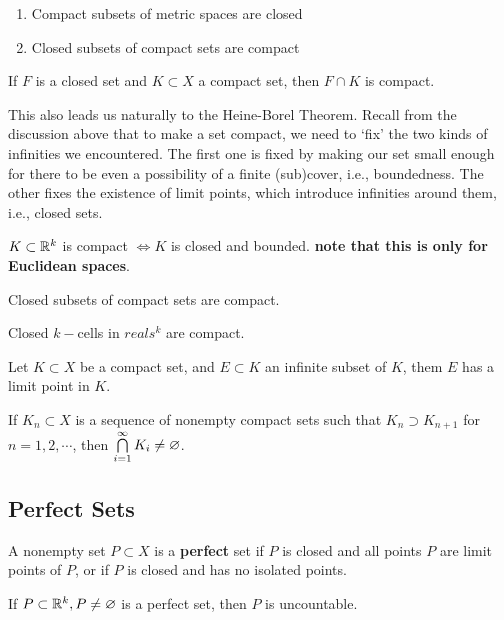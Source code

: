 \begin{lemma}
\begin{enumerate}
\item Compact subsets of metric spaces are closed
\item Closed subsets of compact sets are compact
\end{enumerate}
\end{lemma}
\begin{corollary}
If $F$ is a closed set and $K\subset X$ a compact set, then $F\cap K$ is compact.
\end{corollary}

This also leads us naturally to the Heine-Borel Theorem. Recall from the discussion above that to make a set compact, we need to `fix' the two kinds of infinities we encountered. The first one is fixed by making our set small enough for there to be even a possibility of a finite (sub)cover, i.e., boundedness. The other fixes the existence of limit points, which introduce infinities around them, i.e., closed sets.

\begin{theorem}
$K\subset \mathbb{R}^k$ is compact $\iff K$ is closed and bounded. \textbf{note that this is only for Euclidean spaces}.
\begin{lemma}
Closed subsets of compact sets are compact.
\end{lemma}
\begin{lemma}
Closed $k-$cells in $reals^k$ are compact.
\end{lemma}
\end{theorem}

\begin{theorem}
Let $K\subset X$ be a compact set, and $E\subset K$ an infinite subset of $K$, them $E$ has a limit point in $K$.
\end{theorem}

\begin{theorem}
If $K_n\subset X$ is a sequence of nonempty compact sets such that $K_n\supset K_{n+1}$ for $n=1,2,\cdots$, then $\bigcap\limits_{i=1}^{\infty}K_i \neq \varnothing$.
\end{theorem}

\subsection{Perfect Sets}
\begin{definition}
A nonempty set $P\subset X$ is a \textbf{perfect} set if $P$ is closed and all points $P$ are limit points of $P$, or if $P$ is closed and has no isolated points.
\end{definition}
\begin{theorem}
If $P\subset \mathbb{R}^k, P\neq \varnothing$ is a perfect set, then $P$ is uncountable.
\end{theorem}

